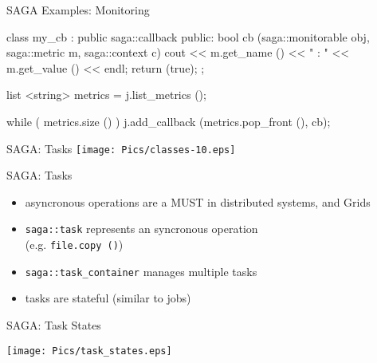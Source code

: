 \documentclass[%
  pdf,
  colorBG,
  slideColor,
  frames,
  ogf
]{prosper}
\newcommand{\T}[1]{\texttt{#1}}
\newcommand{\dn}{\vspace*{+1em}}
\begin{document}

 \begin{slide}{SAGA Examples: Monitoring}

  \begin{mycode}[label=callbacks (cont.)]
  class my_cb : public saga::callback 
  {
    public: 
      bool cb (saga::monitorable obj, 
               saga::metric      m, 
               saga::context     c)
      {
        cout << m.get_name ()  << " : " << m.get_value () << endl;
        return (true);
      }
  };

  list <string> metrics = j.list_metrics ();

  while ( metrics.size () )
  {
    j.add_callback (metrics.pop_front (), cb);
  }
  \end{mycode}
   
 \end{slide}


 \begin{slide}{SAGA: Tasks}
   \texttt{[image: Pics/classes-10.eps]}
 \end{slide}


 \begin{slide}{SAGA: Tasks}

 \dn 

  \begin{itemize}
   \item asyncronous operations are a MUST in distributed systems, and Grids
   \item \T{saga::task} represents an syncronous operation\\ 
         (e.g. \T{file.copy ()})
   \item \T{saga::task\_container} manages multiple tasks
   \item tasks are stateful (similar to jobs)
  \end{itemize}

 \end{slide}


 \begin{slide}{SAGA: Task States}
   \begin{center}
   \texttt{[image: Pics/task\_states.eps]}
   \end{center}
 \end{slide}
\end{document}
